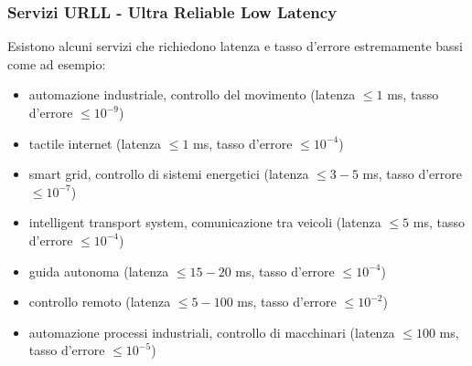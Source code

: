 \subsubsection*{Servizi URLL - Ultra Reliable Low Latency}
Esistono alcuni servizi che richiedono latenza e tasso d'errore estremamente bassi come ad esempio:
\begin{itemize}
	\item automazione industriale, controllo del movimento (latenza \(\leq 1\) ms, tasso d'errore \(\leq 10^{-9}\))
	\item tactile internet (latenza \(\leq 1\) ms, tasso d'errore \(\leq 10^{-4}\))
	\item smart grid, controllo di sistemi energetici (latenza \(\leq 3-5\) ms, tasso d'errore \(\leq 10^{-7}\))
	\item intelligent transport system, comunicazione tra veicoli (latenza \(\leq 5\) ms, tasso d'errore \(\leq 10^{-4}\))
	\item guida autonoma (latenza \(\leq 15 - 20\) ms, tasso d'errore \(\leq 10^{-4}\))
	\item controllo remoto (latenza \(\leq 5-100\) ms, tasso d'errore \(\leq 10^{-2}\))
	\item automazione processi industriali, controllo di macchinari (latenza \(\leq 100\) ms, tasso d'errore \(\leq 10^{-5}\))
\end{itemize}
